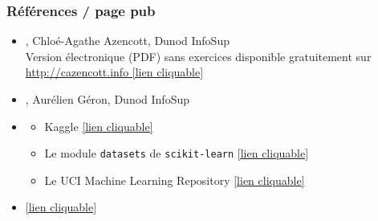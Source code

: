 \begin{frame}
  \frametitle{Références / page pub}
  \begin{itemize}
  \item {}, Chloé-Agathe Azencott, Dunod InfoSup \\
    Version électronique (PDF) sans exercices disponible gratuitement sur  \textcolor{MyBlue}{\href{https://cazencott.info/index.php/pages/Introduction-au-Machine-Learning}{http://cazencott.info [lien cliquable]}}\\
  \item {}, Aurélien Géron, Dunod
    InfoSup
  \item {}
    \begin{itemize}
    \item Kaggle \textcolor{MyBlue}{\href{https://www.kaggle.com/}{[lien cliquable]}}
    \item Le module \texttt{datasets} de \texttt{scikit-learn} \textcolor{MyBlue}{\href{https://scikit-learn.org/stable/datasets.html}{[lien cliquable]}}
    \item Le UCI Machine Learning Repository \textcolor{MyBlue}{\href{https://archive.ics.uci.edu/ml/index.php}{[lien cliquable]}}
    \end{itemize}
  \item {} \textcolor{MyBlue}{\href{https://inria.github.io/scikit-learn-mooc/}{[lien cliquable]}}
  \end{itemize}
\end{frame}


